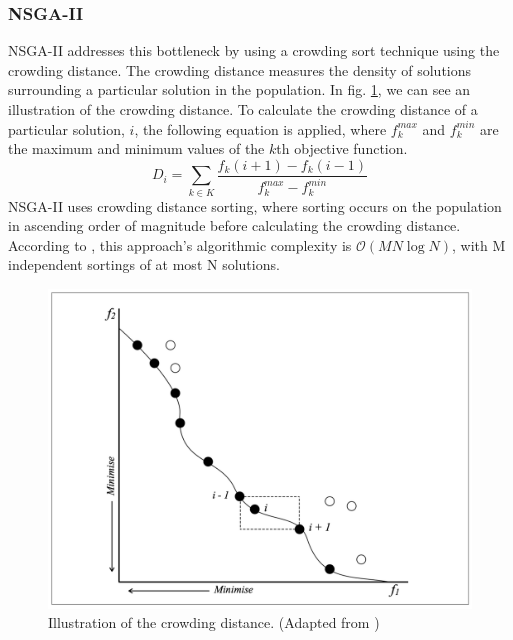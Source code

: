 \documentclass[mscthesis, 11pt]{usiinfthesis}
\theoremstyle{newdefinition}
\begin{document}
\subsubsection{NSGA-II}\label{sec:nsga2}
NSGA-II addresses this bottleneck by using a crowding sort technique using the crowding distance. The crowding distance measures the density of solutions surrounding a particular solution in the population. In fig. \ref{fig:crowding_distance}, we can see an illustration of the crowding distance. To calculate the crowding distance of a particular solution, $i$, the following equation is applied, where $f^{max}_k$ and $f^{min}_k$ are the maximum and minimum values of the $k$th objective function.
\begin{equation}
    D_i = \sum_{k \in K} \frac{f_{k}(i + 1) - f_{k}(i - 1)}{f^{max}_{k} - f^{min}_{k}}
\end{equation}
NSGA-II uses crowding distance sorting, where sorting occurs on the population in ascending order of magnitude before calculating the crowding distance. According to \cite[~p.~185]{deb_fast_2002}, this approach's algorithmic complexity is $\mathcal{O}(MN \log N)$, with M independent sortings of at most N solutions.
\begin{figure}[ht]
    \centering
    \includegraphics[scale = 0.45]{literature_review/crowding_distance.png}
    \caption{Illustration of the crowding distance. (Adapted from \cite[~p.~83]{coello_coello_basic_2007})}
    \label{fig:crowding_distance}
\end{figure}
\end{document}
